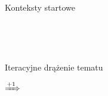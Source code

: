 \documentclass[final]{beamer}
\theoremstyle{bluetheorem}
\theoremstyle{bluetheorem}
\theoremstyle{greentheorem}
\newcommand{\includeinlinescaledsvg}[3]{\begin{minipage}{#1\textwidth}\begin{center}\end{center}\end{minipage}}
\begin{document}
\begin{frame}{Konteksty startowe}
    \begin{block}{}
        \begin{center}
            \includeinlinescaledsvg{.33}{.35}{lambda__contexts__type_001}%
            \includeinlinescaledsvg{.33}{.35}{lambda__contexts__type_002}%
            \includeinlinescaledsvg{.33}{.35}{lambda__contexts__type_003}\\%
            \includeinlinescaledsvg{.33}{.35}{lambda__contexts__type_004}%
            \includeinlinescaledsvg{.33}{.35}{lambda__contexts__type_004b}\\%
            \includeinlinescaledsvg{.33}{.35}{lambda__contexts__type_005}%
            \includeinlinescaledsvg{.33}{.35}{lambda__contexts__type_005b}%
        \end{center}
    \end{block}
\end{frame}

\begin{frame}[fragile]{Iteracyjne drążenie tematu}
    \begin{block}{}
        \begin{center}
            \includeinlinescaledsvg{.4}{.4}{lambda__transformations__001a}%
            \(\xRightarrow{+1}\)%
            \includeinlinescaledsvg{.4}{.4}{lambda__transformations__001b}%
        \end{center}
    \end{block}
\end{frame}
\end{document}
